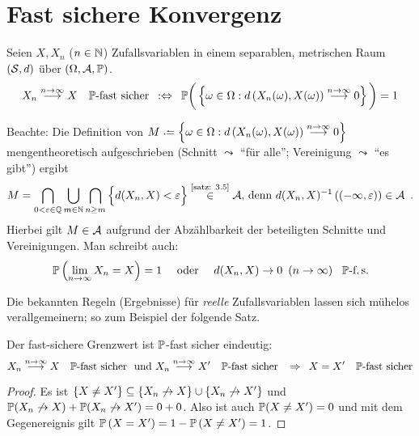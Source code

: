 
\section{Fast sichere Konvergenz}
\begin{definition} \label{definition: 3.6}
	Seien $X, X_n$ ($n \in \N$) Zufallsvariablen in einem separablen, metrischen Raum $(\S,d)$ über $(\Omega,\A,\P)$.
	\begin{equation*}
		X_n \ntoinf X \quad \P\text{-fast sicher}
		\defequiv
		\P\bigg( \menge{\omega \in \Omega : d\brackets{X_n(\omega),X(\omega)} \ntoinf 0} \bigg) = 1
	\end{equation*}
\end{definition}

Beachte: Die Definition von $M \defeq \menge{\omega \in \Omega : d\brackets{X_n(\omega),X(\omega)} \ntoinf 0}$ mengentheoretisch aufgeschrieben (Schnitt $\leadsto$ \enquote{für alle}; Vereinigung $\leadsto$ \enquote{es gibt}) ergibt
\begin{equation*}
	M =
	\bigcap_{0 < \epsilon \in \Q}
	\bigcup_{m \in \N}
	\bigcap_{n \ge m}
	\Big\{ d(X_n,X) < \epsilon \Big\} \overset{\text{\cref{satz: 3.5}}}{\in} \A
	\text{, denn }d(X_n,X)^{-1} \brackets{(-\infty,\epsilon)} \in  \A \satzende
\end{equation*}
Hierbei gilt $M \in \A$ aufgrund der Abzählbarkeit der beteiligten Schnitte und Vereinigungen. 
Man schreibt auch:
\begin{align*}
	\P\brackets{ \lim_{n \to \infty} X_n = X} = 1 \quad \text{ oder } \quad d(X_n, X) \to  0 \enskip (n \to \infty) \enskip \text{ $\P$-f.\,s.}
\end{align*}

Die bekannten Regeln (Ergebnisse) für \textit{reelle} Zufallsvariablen lassen sich mühelos verallgemeinern; so zum Beispiel der folgende Satz.
\begin{satz} \label{satz: 3.7}
	Der fast-sichere Grenzwert ist $\P$-fast sicher eindeutig:
	\begin{equation*}
		X_n \ntoinf X \quad \P\text{-fast sicher } \und 
		X_n \ntoinf X' \quad\P\text{-fast sicher }
		\follows 
		X = X' \quad \P\text{-fast sicher}
	\end{equation*}
\end{satz}
\begin{proof} 
	Es ist $\menge{ X\neq X'} \subseteq \menge{X_n \not\to  X} \cup \menge{X_n \not\to  X'}$ und $\P(X_n \not\to X) + \P(X_n \not\to X') = 0+0$. Also ist auch $\P(X \neq X') = 0$ und mit dem Gegenereignis gilt $\P\brackets{X = X'} = 1-\P\brackets{X\neq X'} = 1$.
\end{proof}

